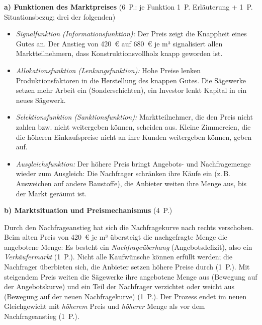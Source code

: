 \begin{loesung}[title={Lösung Aufgabe~1.6 --- Funktionen des Marktpreises}]
\textbf{a) Funktionen des Marktpreises} \hfill (6~P.: je Funktion 1~P. Erläuterung +
1~P. Situationsbezug; drei der folgenden)
\begin{itemize}
  \item \emph{Signalfunktion (Informationsfunktion):} Der Preis zeigt die Knappheit eines
    Gutes an. Der Anstieg von 420~€ auf 680~€ je m³ signalisiert allen Marktteilnehmern,
    dass Konstruktionsvollholz knapp geworden ist.
  \item \emph{Allokationsfunktion (Lenkungsfunktion):} Hohe Preise lenken
    Produktionsfaktoren in die Herstellung des knappen Gutes. Die Sägewerke setzen mehr
    Arbeit ein (Sonderschichten), ein Investor lenkt Kapital in ein neues Sägewerk.
  \item \emph{Selektionsfunktion (Sanktionsfunktion):} Marktteilnehmer, die den Preis
    nicht zahlen bzw. nicht weitergeben können, scheiden aus. Kleine Zimmereien, die die
    höheren Einkaufspreise nicht an ihre Kunden weitergeben können, geben auf.
  \item \emph{Ausgleichsfunktion:} Der höhere Preis bringt Angebots- und Nachfragemenge
    wieder zum Ausgleich: Die Nachfrager schränken ihre Käufe ein (z.\,B. Ausweichen auf
    andere Baustoffe), die Anbieter weiten ihre Menge aus, bis der Markt geräumt ist.
\end{itemize}

\textbf{b) Marktsituation und Preismechanismus} \hfill (4~P.)

Durch den Nachfrageanstieg hat sich die Nachfragekurve nach rechts verschoben. Beim alten
Preis von 420~€ je m³ übersteigt die nachgefragte Menge die angebotene Menge: Es besteht
ein \emph{Nachfrageüberhang} (Angebotsdefizit), also ein \emph{Verkäufermarkt} (1~P.).
Nicht alle Kaufwünsche können erfüllt werden; die Nachfrager überbieten sich, die
Anbieter setzen höhere Preise durch (1~P.). Mit steigendem Preis weiten die Sägewerke
ihre angebotene Menge aus (Bewegung auf der Angebotskurve) und ein Teil der Nachfrager
verzichtet oder weicht aus (Bewegung auf der neuen Nachfragekurve) (1~P.). Der Prozess
endet im neuen Gleichgewicht mit \emph{höherem} Preis und \emph{höherer} Menge als vor dem
Nachfrageanstieg (1~P.).
\end{loesung}

